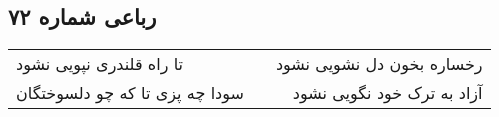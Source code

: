 \begin{center}
\section*{رباعی شماره ۷۲}
\label{sec:sh072}
\begin{longtable}{l p{0.5cm} r}
تا راه قلندری نپویی نشود
&&
رخساره بخون دل نشویی نشود
\\
سودا چه پزی تا که چو دلسوختگان
&&
آزاد به ترک خود نگویی نشود
\\
\end{longtable}
\end{center}
